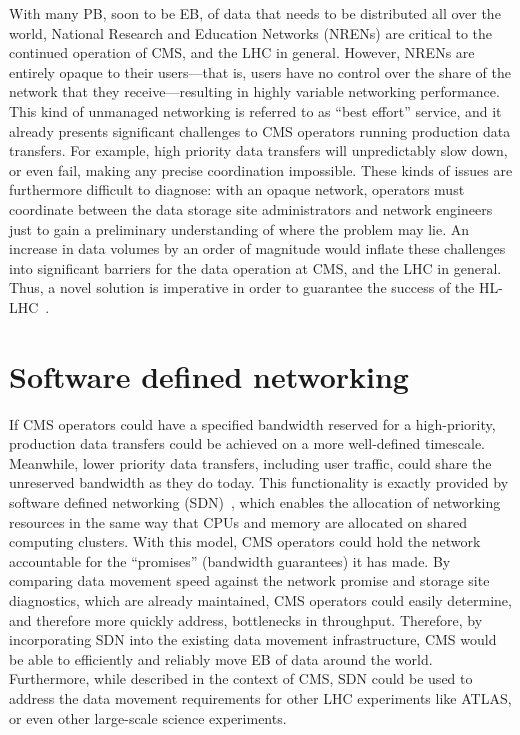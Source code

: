 With many PB, soon to be EB, of data that needs to be distributed all over the world, National Research and Education Networks (NRENs) are critical to the continued operation of CMS, and the LHC in general. 
However, NRENs are entirely opaque to their users---that is, users have no control over the share of the network that they receive---resulting in highly variable networking performance. 
This kind of unmanaged networking is referred to as ``best effort'' service, and it already presents significant challenges to CMS operators running production data transfers. 
For example, high priority data transfers will unpredictably slow down, or even fail, making any precise coordination impossible. 
These kinds of issues are furthermore difficult to diagnose: with an opaque network, operators must coordinate between the data storage site administrators and network engineers just to gain a preliminary understanding of where the problem may lie. 
An increase in data volumes by an order of magnitude would inflate these challenges into significant barriers for the data operation at CMS, and the LHC in general. 
Thus, a novel solution is imperative in order to guarantee the success of the HL-LHC~\cite{HEPSoftwareFoundation2017, Zurawski2021}. 

\section{Software defined networking}
If CMS operators could have a specified bandwidth reserved for a high-priority, production data transfers could be achieved on a more well-defined timescale. 
Meanwhile, lower priority data transfers, including user traffic, could share the unreserved bandwidth as they do today. 
This functionality is exactly provided by software defined networking (SDN)~\cite{SDNSurvey}, which enables the allocation of networking resources in the same way that CPUs and memory are allocated on shared computing clusters. 
With this model, CMS operators could hold the network accountable for the ``promises'' (bandwidth guarantees) it has made. 
By comparing data movement speed against the network promise and storage site diagnostics, which are already maintained, CMS operators could easily determine, and therefore more quickly address, bottlenecks in throughput. 
Therefore, by incorporating SDN into the existing data movement infrastructure, CMS would be able to efficiently and reliably move EB of data around the world. 
Furthermore, while described in the context of CMS, SDN could be used to address the data movement requirements for other LHC experiments like ATLAS, or even other large-scale science experiments. 

